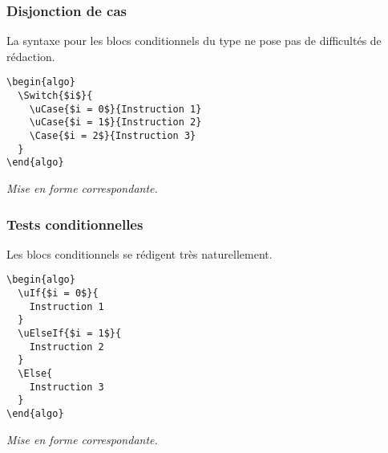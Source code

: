 \documentclass[12pt,a4paper]{article}
\begin{document}
\subsubsection{Disjonction de cas \TTswitch{}}

La syntaxe pour les blocs conditionnels du type \TTswitch{} ne pose pas de difficultés de rédaction.


\begin{multicols}{2}
    \centering
    \begin{frame-gene}
\begin{verbatim}
\begin{algo}
  \Switch{$i$}{
    \uCase{$i = 0$}{Instruction 1}
    \uCase{$i = 1$}{Instruction 2}
    \Case{$i = 2$}{Instruction 3}
  }
\end{algo}
\end{verbatim}
    \end{frame-gene}
    \vfill\null
    \columnbreak
    \textit{Mise en forme correspondante.}
\begin{algo}
\end{algo}
    \vfill\null
\end{multicols}


\subsubsection{Tests conditionnelles \TTif{}}

Les blocs conditionnels \TTif{} se rédigent très naturellement.


\begin{multicols}{2}
    \centering
    \begin{frame-gene}
\begin{verbatim}
\begin{algo}
  \uIf{$i = 0$}{
    Instruction 1
  }
  \uElseIf{$i = 1$}{
    Instruction 2
  }
  \Else{
    Instruction 3
  }
\end{algo}
\end{verbatim}
    \end{frame-gene}
    \vfill\null
    \columnbreak
    \textit{Mise en forme correspondante.}
\begin{algo}
\end{algo}
    \vfill\null
\end{multicols}
\end{document}
